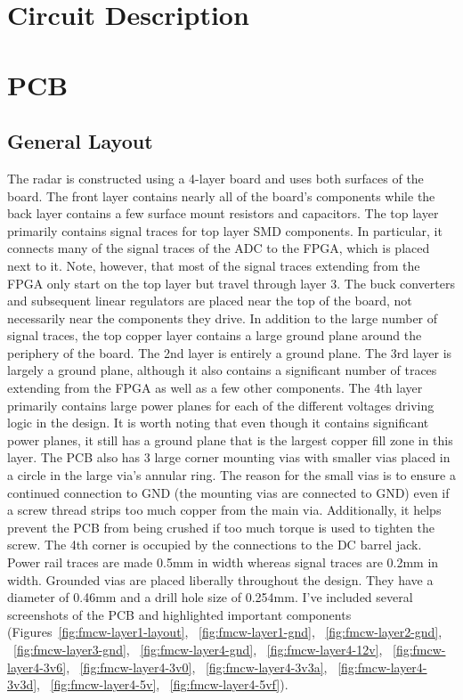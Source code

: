 \documentclass{default}
\begin{document}
\chapter{Circuit Description}
\label{cha:circuit}











\chapter{PCB}
\label{cha:pcb}

\section{General Layout}

The radar is constructed using a 4-layer board and uses both surfaces of the board. The front layer
contains nearly all of the board's components while the back layer contains a few surface mount
resistors and capacitors. The top layer primarily contains signal traces for top layer SMD
components. In particular, it connects many of the signal traces of the ADC to the FPGA, which is
placed next to it. Note, however, that most of the signal traces extending from the FPGA only start
on the top layer but travel through layer 3. The buck converters and subsequent linear regulators
are placed near the top of the board, not necessarily near the components they drive. In addition to
the large number of signal traces, the top copper layer contains a large ground plane around the
periphery of the board. The 2nd layer is entirely a ground plane. The 3rd layer is largely a ground
plane, although it also contains a significant number of traces extending from the FPGA as well as a
few other components. The 4th layer primarily contains large power planes for each of the different
voltages driving logic in the design. It is worth noting that even though it contains significant
power planes, it still has a ground plane that is the largest copper fill zone in this layer. The
PCB also has 3 large corner mounting vias with smaller vias placed in a circle in the large via's
annular ring. The reason for the small vias is to ensure a continued connection to GND (the mounting
vias are connected to GND) even if a screw thread strips too much copper from the main
via. Additionally, it helps prevent the PCB from being crushed if too much torque is used to tighten
the screw. The 4th corner is occupied by the connections to the DC barrel jack. Power rail traces
are made 0.5mm in width whereas signal traces are 0.2mm in width. Grounded vias are placed liberally
throughout the design. They have a diameter of 0.46mm and a drill hole size of 0.254mm. I've
included several screenshots of the PCB and highlighted important components
(Figures~\ref{fig:fmcw-layer1-layout}, ~\ref{fig:fmcw-layer1-gnd}, ~\ref{fig:fmcw-layer2-gnd},
~\ref{fig:fmcw-layer3-gnd}, ~\ref{fig:fmcw-layer4-gnd}, ~\ref{fig:fmcw-layer4-12v},
~\ref{fig:fmcw-layer4-3v6}, ~\ref{fig:fmcw-layer4-3v0}, ~\ref{fig:fmcw-layer4-3v3a},
~\ref{fig:fmcw-layer4-3v3d}, ~\ref{fig:fmcw-layer4-5v}, ~\ref{fig:fmcw-layer4-5vf}).
\end{document}
